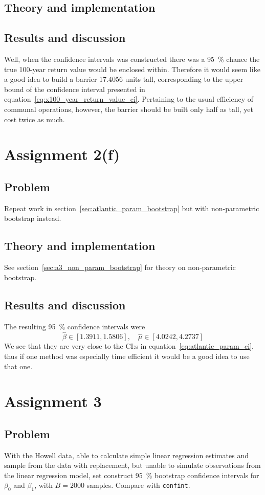 \documentclass[11pt, a4paper]{article}
\begin{document}
\subsection{Theory and implementation}
\subsection{Results and discussion}
Well, when the confidence intervals was constructed there was a \SI{95}{\percent}
chance the true 100-year return value would be enclosed within.
Therefore it would seem like a good idea to build a barrier \num{17.4056} units tall,
corresponding to the upper bound of the confidence interval
presented in equation~\ref{eq:x100_year_return_value_ci}.
Pertaining to the usual efficiency of communal operations, however,
the barrier should be built only half as tall, yet cost twice as much.

\section{Assignment 2(f)}
\subsection{Problem}
Repeat work in section~\ref{sec:atlantic_param_bootstrap} but with non-parametric bootstrap instead.
\subsection{Theory and implementation}
See section~\ref{sec:a3_non_param_bootstrap} for theory on non-parametric bootstrap.
\subsection{Results and discussion}
The resulting \SI{95}{\percent} confidence intervals were
$$ \hat\beta \in [\num{1.3911}, \num{1.5806}], \quad
	\hat\mu \in [\num{4.0242}, \num{4.2737}] $$
We see that they are very close to the CI:s in equation~\ref{eq:atlantic_param_ci},
thus if one method was especially time efficient it would be a good idea to use that one.

\section{Assignment 3}
\subsection{Problem}
With the Howell data,
able to calculate simple linear regression estimates and sample from the data with replacement,
but unable to simulate observations from the linear regression model,
set construct \SI{95}{\percent} bootstrap confidence intervals for $\beta_0$ and $\beta_1$,
with $B = \num{2000}$ samples.
Compare with \texttt{confint}.
\end{document}
